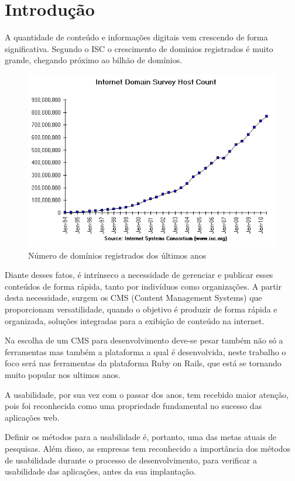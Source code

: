 \chapter{Introdução}

A quantidade de conteúdo e informações digitais vem crescendo de forma significativa. Segundo o ISC o crescimento de dominios registrados é muito grande, chegando próximo ao bilhão de domínios. 

\begin{figure}[here]
\includegraphics[width=150mm]{images/isc_hosts.png}
\caption{Número de domínios registrados dos últimos anos}
\label{fig:isc_hosts.png}
\end{figure}

Diante desses fatos, é intrínseco a necessidade de gerenciar e publicar esses conteúdos de forma rápida, tanto por indivíduos como organizações. A partir desta necessidade, surgem os CMS (Content Management Systems) que proporcionam versatilidade, quando o objetivo é produzir de forma rápida e organizada, soluções integradas para a exibição de conteúdo na internet. 

Na escolha de um CMS para desenvolvimento deve-se pesar também não só a ferramentas mas também a plataforma a qual é desenvolvida, neste trabalho o foco será nas ferramentas da plataforma Ruby on Rails, que está se tornando muito popular nos ultimos anos.

A usabilidade, por sua vez com o passar dos anos, tem recebido maior atenção, pois foi reconhecida como uma propriedade fundamental no sucesso das aplicações web.

Definir os métodos para a usabilidade é, portanto, uma das metas atuais de pesquisas. Além disso, as empresas tem reconhecido a importância dos métodos de usabilidade durante o processo de desenvolvimento, para verificar a usabilidade das aplicações, antes da sua implantação.

